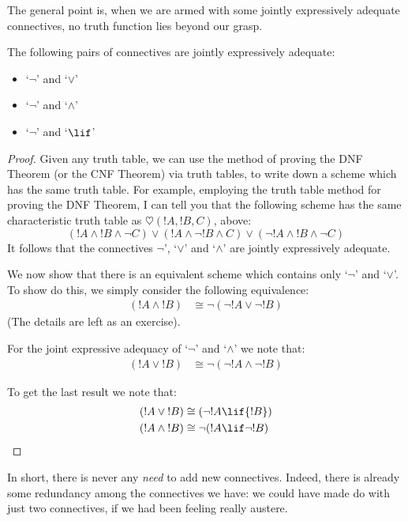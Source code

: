 \documentclass[../../../include/open-logic-section]{subfiles}
\begin{document}
The general point is, when we are armed with some jointly expressively adequate connectives, no truth function lies beyond our grasp. 
	\begin{thm}
		The following pairs of connectives are jointly expressively adequate:
			\begin{itemize}
				\item `$\lnot$' and `$\lor$'
				\item `$\lnot$' and `$\land$'
				\item `$\lnot$' and `$\lif$'
			\end{itemize}
			\begin{proof}
				Given any truth table, we can use the method of proving the DNF Theorem (or the CNF Theorem) via truth tables, to write down a scheme which has the same truth table. For example, employing the truth table method for proving the DNF Theorem, I can tell you that the following scheme has the same characteristic truth table as $\heartsuit({!A},{!B},{C})$, above:
		$$({!A} \land {!B} \land \lnot {C}) \lor ({!A} \land \lnot{!B} \land {C}) \lor (\lnot {!A} \land {!B} \land \lnot {C})$$			
			It follows that the connectives $\lnot$', `$\lor$' and `$\land$' are jointly expressively adequate. 

			We now show that there is an equivalent scheme which contains only `$\lnot$' and `$\lor$'. To show do this, we simply consider the following equivalence:
		\begin{align*}
		({!A} \land {!B}) &\cong \lnot(\lnot {!A} \lor\lnot {!B})
		\end{align*}
		(The details are left as an exercise).

		For the joint expressive adequacy of `$\lnot$' and `$\land$' we note that:
		\begin{align*}
		({!A} \lor {!B}) &\cong \lnot(\lnot {!A} \land\lnot {!B})
		\end{align*}

		To get the last result we note that:
		\begin{align*}
		({!A} \lor {!B}) &\cong (\lnot {!A} \lif{!B})\\
		({!A} \land {!B}) &\cong \lnot({!A} \lif \lnot{!B})
		\end{align*}
			\end{proof}
	\end{thm}\noindent
In short, there is never any \emph{need} to add new connectives. Indeed, there is already some redundancy among the connectives we have: we could have made do with just two connectives, if we had been feeling really austere.
\end{document}
